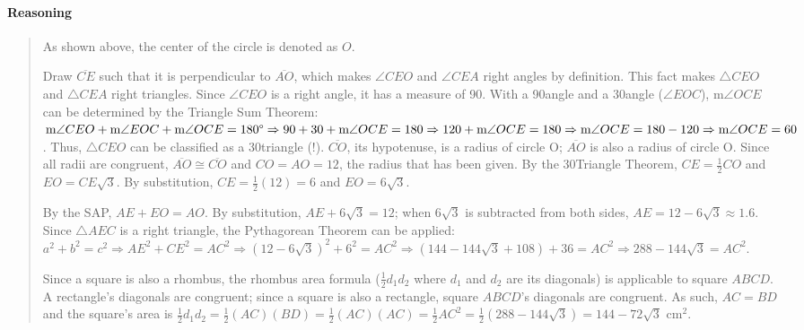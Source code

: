 \documentclass[letterpaper,12pt,twoside]{report}
\begin{document}
	\paragraph{Reasoning}
	\begin{quotation}
		
		As shown above, the center of the circle is denoted as $O$.
		
		Draw $\overline{CE}$ such that it is perpendicular to $\overline{AO}$, which makes $\angle CEO$ and $\angle CEA$ right angles by definition. This fact makes $\triangle CEO$ and $\triangle CEA$ right triangles. Since $\angle CEO$ is a right angle, it has a measure of 90\textdegree. With a 90\textdegree   \space angle and a 30\textdegree \space angle ($\angle EOC$), m$\angle OCE$ can be determined by the Triangle Sum Theorem: $\text{m}\angle CEO+\text{m}\angle EOC+\text{m}\angle OCE=180\text{\textdegree} \Rightarrow 90+30+\text{m}\angle OCE=180 \Rightarrow 120+\text{m}\angle OCE=180 \Rightarrow \text{m}\angle OCE=180-120 \Rightarrow \text{m}\angle OCE=60$\textdegree. Thus, $\triangle CEO$ can be classified as a 30\textdegree \space triangle (!). $\overline{CO}$, its hypotenuse, is a radius of circle O; $\overline{AO}$ is also a radius of circle O. Since all radii are congruent, $\overline{AO}\cong\overline{CO}$ and $CO=AO=12$, the radius that has been given. By the 30\textdegree \space Triangle Theorem, $CE=\frac{1}{2}CO$ and $EO=CE\sqrt{3}$. By substitution, $CE=\frac{1}{2}(12)=6$ and $EO=6\sqrt{3}$.
		
		By the SAP, $AE+EO=AO$. By substitution, $AE+6\sqrt{3}=12$; when $6\sqrt{3}$ is subtracted from both sides, $AE=12-6\sqrt{3}\approx 1.6$. Since $\triangle AEC$ is a right triangle, the Pythagorean Theorem can be applied: $a^2+b^2=c^2 \Rightarrow AE^2+CE^2=AC^2 \Rightarrow (12-6\sqrt{3})^2+6^2=AC^2 \Rightarrow (144-144\sqrt{3}+108)+36=AC^2 \Rightarrow 288-144\sqrt{3}=AC^2$.
		
		Since a square is also a rhombus, the rhombus area formula ($\frac{1}{2}d_1 d_2$ where $d_1$ and $d_2$ are its diagonals) is applicable to square $ABCD$. A rectangle's diagonals are congruent; since a square is also a rectangle, square $ABCD$'s diagonals are congruent. As such, $AC=BD$ and the square's area is $\frac{1}{2}d_1 d_2=\frac{1}{2}(AC)(BD)=\frac{1}{2}(AC)(AC)=\frac{1}{2}AC^2=\frac{1}{2}(288-144\sqrt{3})=\boxed{144-72\sqrt{3}\text{  cm}^2}$.
			
\end{quotation}
	
	
\end{document}
